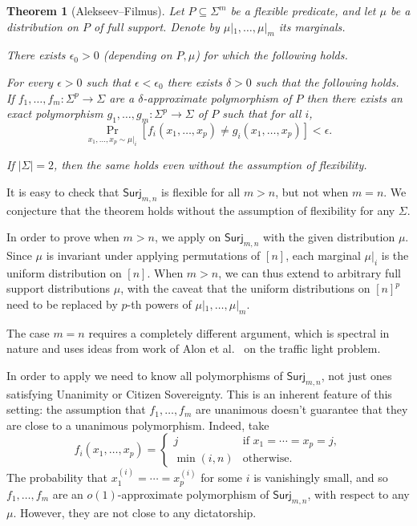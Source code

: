 \documentclass{article}
\providecommand{\Surj}{\mathsf{Surj}}
\newtheorem{theorem}{Theorem}[section]
\theoremstyle{definition}
\theoremstyle{remark}
\begin{document}
\begin{theorem}[Alekseev--Filmus]
\label{thm:alekseev-filmus}
Let $P \subseteq \Sigma^m$ be a flexible predicate, and let $\mu$ be a distribution on $P$ of full support. Denote by $\mu|_1,\dots,\mu|_m$ its marginals.

There exists $\epsilon_0 > 0$ (depending on $P,\mu$) for which the following holds.

For every $\epsilon > 0$ such that $\epsilon < \epsilon_0$ there exists $\delta > 0$ such that the following holds. If $f_1,\dots,f_m\colon \Sigma^p \to \Sigma$ are a $\delta$-approximate polymorphism of $P$ then there exists an exact polymorphism $g_1,\dots,g_m\colon \Sigma^p \to \Sigma$ of $P$ such that for all $i$,
\[
 \Pr_{x_1,\dots,x_p \sim \mu|_i}[f_i(x_1,\dots,x_p) \neq g_i(x_1,\dots,x_p)] < \epsilon.
\]

If $|\Sigma| = 2$, then the same holds even without the assumption of flexibility.
\end{theorem}

It is easy to check that $\Surj_{m,n}$ is flexible for all $m > n$, but not when $m = n$. We conjecture that the theorem holds without the assumption of flexibility for any $\Sigma$.

In order to prove  when $m > n$, we apply  on $\Surj_{m,n}$ with the given distribution $\mu$. Since $\mu$ is invariant under applying permutations of $[n]$, each marginal $\mu|_i$ is the uniform distribution on $[n]$. When $m > n$, we can thus extend  to arbitrary full support distributions $\mu$, with the caveat that the uniform distributions on $[n]^p$ need to be replaced by $p$-th powers of $\mu|_1,\dots,\mu|_m$.

The case $m = n$ requires a completely different argument, which is spectral in nature and uses ideas from work of Alon et al.~\cite{ADFS} on the traffic light problem. 

\medskip

In order to apply  we need to know all polymorphisms of $\Surj_{m,n}$, not just ones satisfying Unanimity or Citizen Sovereignty. This is an inherent feature of this setting: the assumption that $f_1,\dots,f_m$ are unanimous doesn't guarantee that they are close to a unanimous polymorphism. Indeed, take
\[
 f_i(x_1,\dots,x_p) =
 \begin{cases}
     j & \text{if } x_1 = \cdots = x_p = j, \\
     \min(i,n) & \text{otherwise}.
 \end{cases}
\]
The probability that $x^{(i)}_1 = \cdots = x^{(i)}_p$ for some $i$ is vanishingly small, and so $f_1,\dots,f_m$ are an $o(1)$-approximate polymorphism of $\Surj_{m,n}$, with respect to any $\mu$. However, they are not close to any dictatorship.
\end{document}
